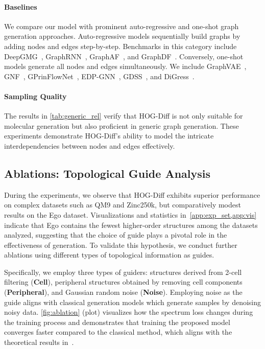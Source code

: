 \paragraph{Baselines}
%
We compare our model with prominent auto-regressive and one-shot graph generation approaches. 
Auto-regressive models sequentially build graphs by adding nodes and edges step-by-step.
Benchmarks in this category include DeepGMG~\cite{deepgmg}, GraphRNN~\cite{GraphRNN2018}, GraphAF~\cite{GraphAF-ICLR2020}, and GraphDF~\cite{GraphDF-ICML2021}.
Conversely, one-shot models generate all nodes and edges simultaneously. 
We include GraphVAE~\cite{GraphVAE-DrugDiscovery}, GNF~\cite{GNF-NeurIPS2019}, GPrinFlowNet~\cite{GPrinFlowNet+ACM2024}, EDP-GNN~\cite{EDPGNN-2020}, GDSS~\cite{GDSS+ICML2022}, and DiGress~\cite{DiGress+ICLR2023}.

\paragraph{Sampling Quality}
The results in \cref{tab:generic_rel} verify that HOG-Diff is not only suitable for molecular generation but also proficient in generic graph generation.
These experiments demonstrate HOG-Diff’s ability to model the intricate interdependencies between nodes and edges effectively. 


\subsection{Ablations: Topological Guide Analysis}
\label{sec:ablations}

During the experiments, we observe that HOG-Diff exhibits superior performance on complex datasets such as QM9 and Zinc250k, but comparatively modest results on the Ego dataset.
Visualizations and statistics in~\cref{app:exp_set,app:vis} indicate that Ego contains the fewest higher-order structures among the datasets analyzed, suggesting that the choice of guide plays a pivotal role in the effectiveness of generation.
To validate this hypothesis, we conduct further ablations using different types of topological information as guides.

Specifically, we employ three types of guiders: structures derived from 2-cell filtering (\textbf{Cell}), peripheral structures obtained by removing cell components (\textbf{Peripheral}), and Gaussian random noise (\textbf{Noise}).
Employing noise as the guide aligns with classical generation models which generate samples by denoising noisy data.
\cref{fig:ablation} (plot) visualizes how the spectrum loss changes during the training process and demonstrates that training the proposed model converges faster compared to the classical method, which aligns with the theoretical results in~.



